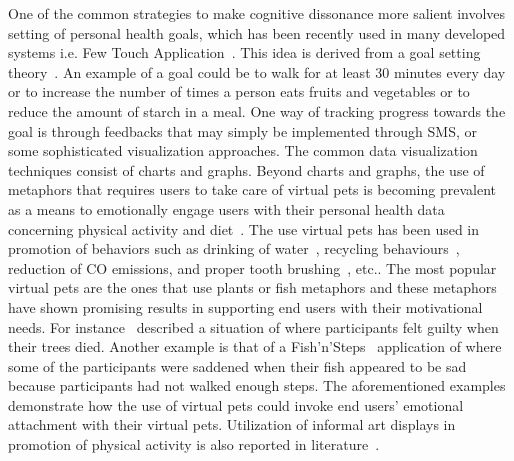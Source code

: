 One of the common strategies to make cognitive dissonance more salient involves setting of personal health goals, which has been recently used in many developed systems i.e. Few Touch Application~\citep{arsand:mobile}. This idea is derived from a goal setting theory~\citep{strecher1995goal}. An example of a goal could be to walk for at least 30 minutes every day or to increase the number of times a person eats fruits and vegetables or to reduce the amount of starch in a meal. One way of tracking progress towards the goal is through feedbacks that may simply be implemented through SMS, or some sophisticated visualization approaches. The common data visualization techniques consist of charts and graphs. Beyond charts and graphs, the use of metaphors that requires users to take care of virtual pets is becoming prevalent as a means to emotionally engage users with their personal health data concerning physical activity and diet~\citep{lin2006:fish,albaina2009flowie,klasnja2009:using,pollak2010s,nakajima2013designing}. The use virtual pets has been used in promotion of behaviors such as drinking of water~\citep{lessel2016watercoaster}, recycling behaviours~\citep{comber2013designing}, reduction of CO emissions, and proper tooth brushing~\citep{nakajima2013designing}, etc.. The most popular virtual pets are the ones that use plants or fish metaphors and these metaphors have shown promising results in supporting end users with their motivational needs. For instance~\cite{nakajima2013designing} described a situation of where participants felt guilty when their trees died. Another example is that of a Fish'n'Steps~\citep{lin2006:fish} application of where some of the participants were saddened when their fish appeared to be sad because participants had not walked enough steps. The aforementioned examples demonstrate how the use of virtual pets could invoke end users' emotional attachment with their virtual pets. Utilization of informal art displays in promotion of physical activity is also reported in literature~\citep{fan2012spark,nakajima2013designing}. 

